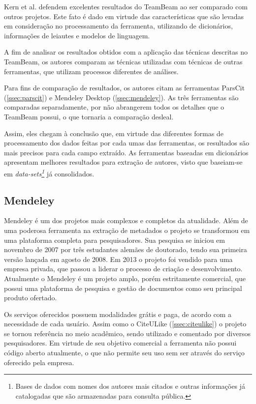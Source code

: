 Kern et al. defendem excelentes resultados do TeamBeam ao ser comparado com outros projetos. Este fato é dado em virtude das características que são levadas em consideração no processamento da ferramenta, utilizando de dicionários, informações de leiautes e modelos de linguagem.

A fim de analisar os resultados obtidos com a aplicação das técnicas descritas no TeamBeam, os autores comparam as técnicas utilizadas com técnicas de outras ferramentas, que utilizam processos diferentes de análises.

Para fins de comparação de resultados, os autores citam as ferramentas ParsCit (\autoref{ssec:parscit}) e Mendeley Desktop (\autoref{ssec:mendeley}). As três ferramentas são comparadas separadamente, por não abrangerem todos os detalhes que o TeamBeam possui, o que tornaria a comparação desleal.

Assim, eles chegam à conclusão que, em virtude das diferentes formas de processamento dos dados feitas por cada umas das ferramentas, os resultados são mais precisos para cada campo extraído. As ferramentas baseadas em dicionários apresentam melhores resultados para extração de autores, visto que baseiam-se em \textit{data-sets\footnote{Bases de dados com nomes dos autores mais citados e outras informações já catalogadas que são armazenadas para consulta pública.}} já consolidados.

\subsection{Mendeley}
\label{ssec:mendeley}

Mendeley é um dos projetos mais complexos e completos da atualidade. Além de uma poderosa ferramenta na extração de metadados o projeto se transformou em uma plataforma completa para pesquisadores. Sua pesquisa se iniciou em novembro de 2007 por três estudantes alemães de doutorado, tendo sua primeira versão lançada em agosto de 2008. Em 2013 o projeto foi vendido para uma empresa privada, que passou a liderar o processo de criação e desenvolvimento. Atualmente o Mendeley é um projeto amplo, porém estritamente comercial, que possui uma plataforma de pesquisa e gestão de documentos como seu principal produto ofertado.

Os serviços oferecidos possuem modalidades grátis e paga, de acordo com a necessidade de cada usuário. Assim como o CiteULike (\autoref{ssec:citeulike}) o projeto se tornou referência no meio acadêmico, sendo utilizado e comentado por diversos pesquisadores. Em virtude de seu objetivo comercial a ferramenta não possui código aberto atualmente, o que não permite seu uso sem ser através do serviço oferecido pela empresa.

